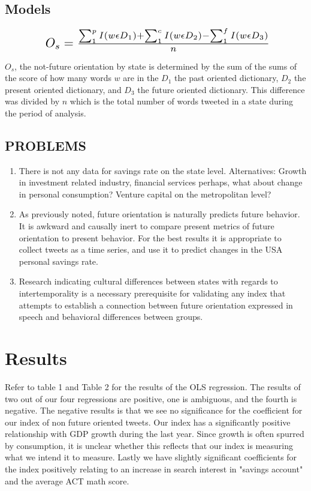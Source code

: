 \documentclass{article}
\begin{document}
\subsection{Models}

\[ \scalebox{1.5}{ $O_s = \frac{\sum^p_1 I(w \epsilon D_1) + \sum^c_1 I(w \epsilon D_2 ) - \sum^f_1 I(w \epsilon D_3 ) }{n}  $} \]

$O_s$, the not-future orientation by state is determined by the sum of the sums of the score of how many words $w$ are in the $D_1$ the past oriented dictionary, $D_2$ the present oriented dictionary, and $D_3$ the future oriented dictionary. 
This difference was divided by $n$ which is the total number of words tweeted in a state during the period of analysis. 



\subsection{PROBLEMS}

\begin{enumerate}
    \item There is not any data for savings rate on the state level. Alternatives: Growth in investment related industry, financial services perhaps, what about change in personal consumption? Venture capital on the metropolitan level? 
    \item As previously noted, future orientation is naturally predicts future behavior. It is awkward and causally inert to compare present metrics of future orientation to present behavior. For the best results it is appropriate to collect tweets as a time series, and use it to predict changes in the USA personal savings rate. 
    \item Research indicating cultural differences between states with regards to intertemporality is a necessary prerequisite for validating any index that attempts to establish a connection between future orientation expressed in speech and behavioral differences between groups.
  
\end{enumerate}

\section{Results}
Refer to table 1 and Table 2 for the results of the OLS regression. The results of two out of our four regressions are positive, one is ambiguous, and the fourth is negative. The negative results is that we see no significance for the coefficient for our index of non future oriented tweets. Our index has a significantly positive relationship with GDP growth during the last year. Since growth is often spurred by consumption, it is unclear whether this reflects that our index is measuring what we intend it to measure. Lastly we have slightly significant coefficients for the index positively relating to an increase in search interest in "savings account" and the average ACT math score. 
\end{document}
